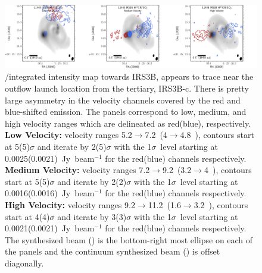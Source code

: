 \begin{figure}[H]
\begin{center}
   \includegraphics[width=1\textwidth]{img/L1448IRS3B_H13CN_clean_image_2_binned__panel.pdf} %
\end{center}
   \caption{\htcn/\sot\space integrated intensity map towards IRS3B, appears to trace near the outflow launch location from the tertiary, IRS3B-c. There is pretty large asymmetry in the velocity channels covered by the red and blue-shifted emission. The panels correspond to low, medium, and high velocity ranges which are delineated as red(blue), respectively. \textbf{Low Velocity:} velocity ranges 5.2$\rightarrow$7.2~\kms (4$\rightarrow$4.8~\kms), contours start at 5(5)$\sigma$ and iterate by 2(5)$\sigma$ with the 1$\sigma$~level starting at 0.0025(0.0021)~Jy~beam$^{-1}$ for the red(blue) channels respectively. \textbf{Medium Velocity:} velocity ranges 7.2$\rightarrow$9.2~\kms (3.2$\rightarrow$4~\kms), contours start at 5(5)$\sigma$ and iterate by 2(2)$\sigma$ with the 1$\sigma$~level starting at 0.0016(0.0016)~Jy~beam$^{-1}$ for the red(blue) channels respectively. \textbf{High Velocity:} velocity ranges 9.2$\rightarrow$11.2~\kms (1.6$\rightarrow$3.2~\kms), contours start at 4(4)$\sigma$ and iterate by 3(3)$\sigma$ with the 1$\sigma$~level starting at 0.0021(0.0021)~Jy~beam$^{-1}$ for the red(blue) channels respectively. The \htcn\space synthesized beam (\htcnbeam) is the bottom-right most ellipse on each of the panels and the continuum synthesized beam (\contbeam) is offset diagonally.}\label{fig:irs3bh13cnmoment}
\end{figure}






